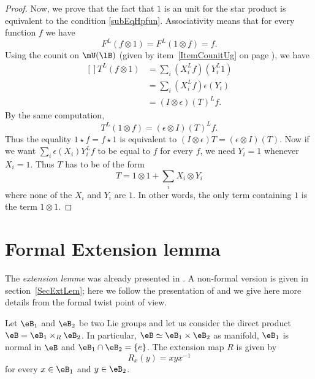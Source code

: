 \begin{proof}
	Now, we prove that the fact that $1$ is an unit for the star product is equivalent to the condition \eqref{subEqHpfun}. Associativity means that for every function $f$ we have
	\begin{equation}
		F^L(f\otimes 1)=F^L(1\otimes f)=f.
	\end{equation}
	Using the counit on $\mU(\lB)$ (given by item~\ref{ItemCounitUg} on page \pageref{ItemCounitUg}), we have
	\begin{equation}
		\begin{aligned}[]
			T^L(f\otimes 1)&=\sum_i(X_i^Lf)(Y_i^L1)\\
			&=\sum_i(X_i^Lf)\epsilon(Y_i)\\
			&=(I\otimes \epsilon)(T)^Lf.
		\end{aligned}
	\end{equation}
	By the same computation,
	\begin{equation}
		T^L(1\otimes f)=(\epsilon\otimes I)(T)^Lf.
	\end{equation}
	Thus the equality $1\star f=f\star 1$ is equivalent to $(I\otimes\epsilon)T=(\epsilon\otimes I)(T)$. Now if we want $\sum_i\epsilon(X_i)Y_i^Lf$ to be equal to $f$ for every $f$, we need $Y_i=1$ whenever $X_i=1$. Thus $T$ has to be of the form
	\begin{equation}
		T=1\otimes 1+\sum_iX_i\otimes Y_i
	\end{equation}
	where none of the $X_i$ and $Y_i$ are $1$. In other words, the only term containing $1$ is the term $1\otimes 1$.
\end{proof}

\section{Formal Extension lemma}		\label{SecExtenLemK}

The \emph{extension lemme} was already presented in \cite{These,articleBVCS}. A non-formal version is given in section~\ref{SecExtLem}; here we follow the presentation of \cite{QuantifKhalerian} and we give here more details from the formal twist point of view.

Let $\eB_1$ and $\eB_2$ be two Lie groups and let us consider the direct product $\eB=\eB_1\times_R\eB_2$. In particular, $\eB\simeq\eB_1\times\eB_2$ as manifold, $\eB_1$ is normal in $\eB$ and $\eB_1\cap\eB_2=\{ e \}$. The extension map $R$ is given by
\begin{equation}
	R_x(y)=xyx^{-1}
\end{equation}
for every $x\in\eB_1$ and $y\in\eB_2$.

